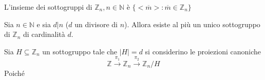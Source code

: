         \begin{corollary}
            L'insieme dei sottogruppi di $\mathbb{Z}_n, n \in \mathbb{N}$ è $\{<\overline{m}>: \overline{m} \in \mathbb{Z}_n\}$ 
        \end{corollary}
        \begin{proposition}
            Sia $n \in \mathbb{N}$ e sia $d|n$ ($d$ un divisore di $n$). Allora esiste al più un unico sottogruppo di $\mathbb{Z}_n$ di cardinalità $d$.
        \end{proposition}
        \begin{dimos*}
            Sia $H \subseteq \mathbb{Z}_n$ un sottogruppo tale che $|H|=d$ si considerino le proiezioni canoniche
            $$\mathbb{Z} \xrightarrow{\pi_1} \mathbb{Z}_n \xrightarrow{\pi_2} \mathbb{Z}_n/H$$
            Poiché $$
        \end{dimos*}
